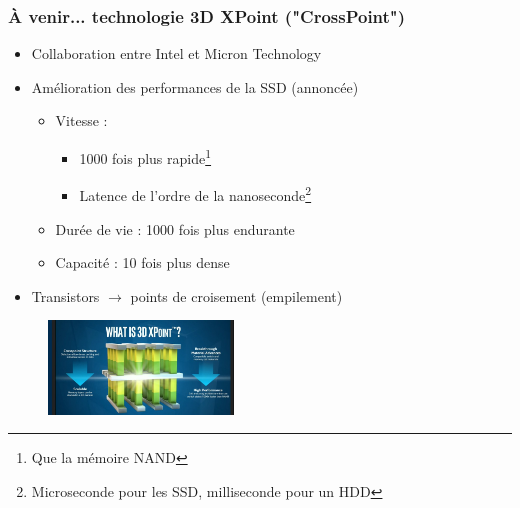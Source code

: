 \begin{frame}
\frametitle{À venir... technologie 3D XPoint ("CrossPoint") \cite{XPoint}}
\begin{itemize}
\item Collaboration entre Intel et Micron Technology
\item Amélioration des performances de la SSD (annoncée)
\begin{itemize}
\item Vitesse : 
\begin{itemize}
\item 1000 fois plus rapide\footnote{Que la mémoire NAND}
\item Latence de l'ordre de la nanoseconde\footnote{Microseconde pour les SSD, milliseconde pour un HDD}
\end{itemize}

\item Durée de vie : 1000 fois plus endurante
\item Capacité : 10 fois plus dense
\end{itemize}
\item Transistors $\rightarrow$  points de croisement (empilement)
\end{itemize}

\begin{figure}[htbp]
\begin{center}
\includegraphics[height=2.5cm]{../illustration/XPoint.jpg}
\label{default}
\end{center}
\end{figure}

\end{frame}

